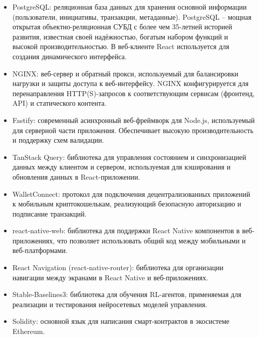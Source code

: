 \documentclass[
    14pt,
    specialist,
    candidate, %
    subf, %
    href,
    dotsinheaders=false
]{disser}
\begin{document}
\begin{itemize}
  \item PostgreSQL: реляционная база данных для хранения основной информации (пользователи, инициативы, транзакции, метаданные). PostgreSQL – мощная открытая объектно-реляционная СУБД с более чем 35-летней историей развития, известная своей надёжностью, богатым набором функций и высокой производительностью. В веб-клиенте React используется для создания динамического интерфейса. \cite{docs_postgresql_2025}

  \item NGINX: веб-сервер и обратный прокси, используемый для балансировки нагрузки и  защиты доступа к веб-интерфейсу. NGINX конфигурируется для перенаправления HTTP(S)-запросов к соответствующим сервисам (фронтенд, API) и статического контента. \cite{docs_nginx_2025}

  \item Fastify: современный асинхронный веб-фреймворк для Node.js, используемый для серверной части приложения. Обеспечивает высокую производительность и поддержку схем валидации. \cite{docs_fastify_2025}

  \item TanStack Query: библиотека для управления состоянием и синхронизацией данных между клиентом и сервером, используемая для кэширования и обновления данных в React-приложении. \cite{docs_tanstack_query_2025}

  \item WalletConnect: протокол для подключения децентрализованных приложений к мобильным криптокошелькам, реализующий безопасную авторизацию и подписание транзакций. \cite{docs_walletconnect_2025}

  \item react-native-web: библиотека для поддержки React Native компонентов в веб-приложениях, что позволяет использовать общий код между мобильными и веб-платформами. \cite{docs_react_native_web_2025}

  \item React Navigation (react-native-router): библиотека для организации навигации между экранами в React Native и веб-приложениях. \cite{docs_react_native_router_2025}

  \item Stable-Baselines3: библиотека для обучения RL-агентов, применяемая для реализации и тестирования нейросетевых моделей управления. \cite{docs_stable_baselines3_2025}

  \item Solidity: основной язык для написания смарт-контрактов в экосистеме Ethereum. \cite{docs_solidity_2025}


\end{itemize}
\end{document}
